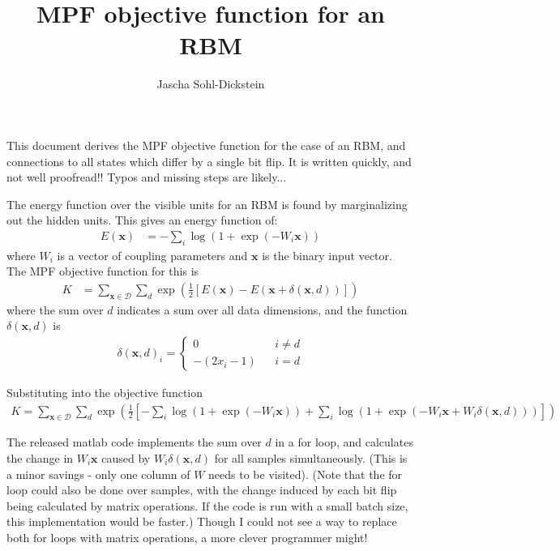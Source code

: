 \documentclass{article}
\title{MPF objective function for an RBM}
\author{
Jascha Sohl-Dickstein
}
\newcommand{\mb}{\mathbf}
\begin{document}
\maketitle

This document derives the MPF objective function for the case of an RBM, and connections to all states which differ by a single bit flip.  It is written quickly, and not well proofread!!  Typos and missing steps are likely...

The energy function over the visible
units for an RBM is found by marginalizing out the hidden units.  This
gives an energy function of:
\begin{align}
E(\mb x) &= -\sum_i \log ( 1 + \exp ( -W_i \mb x ) )
\end{align}
where $W_i$ is a vector of coupling parameters and $\mb x$ is the binary input
vector.  The MPF objective function for this is
\begin{align}
K &= \sum_{\mb x \in \mathcal D} \sum_d \exp\left( \frac{1}{2}\left[
E(\mb x) - E(\mb x + \delta(\mb x, d)) \right] \right)
\end{align}
where the sum over $d$ indicates a sum over all data dimensions, and
the function $\delta(\mb x, d)$ is
\begin{align}
\delta(\mb x, d)_i =
	\left\{\begin{array}{ccc}
0 & & i \neq d \\
-(2 x_i - 1) & & i = d
	\end{array}\right.
\end{align}

Substituting into the objective function
\begin{align}
K = \sum_{\mb x \in \mathcal D} \sum_d \exp\left( \frac{1}{2}\left[
-\sum_i \log ( 1 + \exp ( -W_i \mb x ) )
+
\sum_i \log ( 1 + \exp ( -W_i \mb x + W_i \delta(\mb x, d)  ) )
\right] \right)
\end{align}

The released matlab code implements the sum over $d$ in a for loop, and
calculates the change in $W_i \mb x$ caused by $W_i \delta( \mb x, d
)$ for all samples simultaneously.  (This is a minor savings - only one column of $W$ needs to be visited).  (Note that the for loop could also
be done over samples, with the change induced by each bit flip being
calculated by matrix operations.  If the code is run with a small
batch size, this implementation would be faster.)  Though I could not
see a way to replace both for loops with matrix operations, a more
clever programmer might!
		
\end{document}
